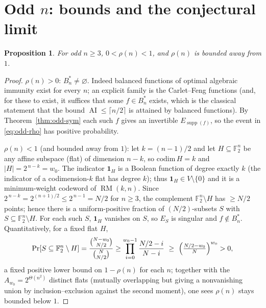 \documentclass{amsart}
\newtheorem{proposition}[theorem]{Proposition}
\theoremstyle{definition}
\DeclareMathOperator{\AI}{AI}
\DeclareMathOperator{\supp}{supp}
\DeclareMathOperator{\RM}{RM}
\newcommand{\F}{\mathbb{F}}
\begin{document}
\section{Odd $n$: bounds and the conjectural limit}\label{sec:odd-asy}

\begin{proposition}\label{prop:oddbounds}
For odd $n\ge3$, $0<\rho(n)<1$, and $\rho(n)$ is bounded away from $1$.
\end{proposition}
\begin{proof}
$\rho(n)>0$: $B_n^*\neq\varnothing$. Indeed balanced functions of optimal
algebraic immunity exist for every $n$; an explicit family is the
Carlet--Feng functions (and, for these to exist, it suffices that some
$f\in B_n^*$ exists, which is the classical statement that the bound
$\AI\le\lceil n/2\rceil$ is attained by balanced functions). By
Theorem~\ref{thm:odd-sym} each such $f$ gives an invertible $E_{\supp(f)}$,
so the event in \eqref{eq:odd-rho} has positive probability.

$\rho(n)<1$ (and bounded away from $1$): let $k=(n-1)/2$ and let
$H\subseteq\F_2^n$ be any affine subspace (flat) of dimension $n-k$, so
$\mathrm{codim}\,H=k$ and $|H|=2^{\,n-k}=w_0$. The indicator $\mathbf 1_H$
is a Boolean function of degree exactly $k$ (the indicator of a
codimension-$k$ flat has degree $k$); thus $\mathbf 1_H\in V\setminus\{0\}$
and it is a minimum-weight codeword of $\RM(k,n)$. Since
$2^{\,n-k}=2^{(n+1)/2}\le 2^{\,n-1}=N/2$ for $n\ge3$, the complement
$\F_2^n\setminus H$ has $\ge N/2$ points; hence there is a uniform-positive
fraction of $(N/2)$-subsets $S$ with $S\subseteq\F_2^n\setminus H$. For
each such $S$, $\mathbf 1_H$ vanishes on $S$, so $E_S$ is singular and
$f\notin B_n^*$. Quantitatively, for a fixed flat $H$,
\[
\Pr[S\subseteq\F_2^n\setminus H]=\frac{\binom{N-w_0}{N/2}}{\binom{N}{N/2}}
\ge\prod_{i=0}^{w_0-1}\frac{N/2-i}{N-i}\ \ge\ \Bigl(\tfrac{N/2-w_0}{N}\Bigr)^{w_0}>0,
\]
a fixed positive lower bound on $1-\rho(n)$ for each $n$; together with the
$A_{w_0}=2^{\Theta(n^2)}$ distinct flats (mutually overlapping but giving a
nonvanishing union by inclusion--exclusion against the second moment), one
sees $\rho(n)$ stays bounded below $1$.
\end{proof}
\end{document}
